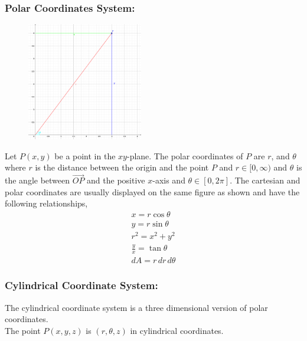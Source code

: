 \documentclass[14pt]{article}
\begin{document}
    \subsubsection{Polar Coordinates System:}
    \begin{figure}
        \vspace{-20pt}
        \includegraphics[width=0.45\textwidth]{polarCord.eps}
        \vspace{-20pt}
    \end{figure}
    Let $P(x,y )$ be a point in the $xy$-plane. The polar coordinates of $P$ are $r$, and $\theta$ where $r$ is the distance between the origin and the point $P$ and $r\in[0, \infty)$ and $\theta$ is the angle between $\vec{OP}$ and the positive $x$-axis and $\theta\in[0, 2\pi]$. The cartesian and polar coordinates are usually displayed on the same figure as shown and have the following relationships,
    \begin{align*}
        x=r\cos\theta\\
        y=r\sin\theta\\
        r^2=x^2+y^2\\
        \frac{y}{x}=\tan\theta\\
        dA=r\, dr\, d\theta
    \end{align*} 
    \subsubsection{Cylindrical Coordinate System:}
    The cylindrical coordinate system is a three dimensional version of polar coordinates.\\ The point $P(x,y,z)$ is $(r, \theta, z)$ in cylindrical coordinates.
\end{document}

